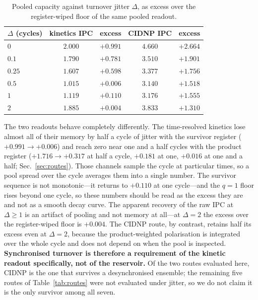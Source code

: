 \documentclass[aps,prx,reprint,superscriptaddress,nofootinbib,floatfix]{revtex4-2}
\begin{document}
\begin{table}[H]
\caption{\label{tab:desync}Pooled capacity against turnover jitter $\Delta$,
as excess over the register-wiped floor of the same pooled readout.}
\begin{ruledtabular}
\begin{tabular}{lcccc}
$\Delta$ (cycles) & kinetics IPC & excess & CIDNP IPC & excess \\
\hline
$0$    & $2.000$ & $+0.991$ & $4.660$ & $+2.664$ \\
$0.1$  & $1.790$ & $+0.781$ & $3.510$ & $+1.901$ \\
$0.25$ & $1.607$ & $+0.598$ & $3.377$ & $+1.756$ \\
$0.5$  & $1.015$ & $+0.006$ & $3.140$ & $+1.518$ \\
$1$    & $1.119$ & $+0.110$ & $3.176$ & $+1.555$ \\
$2$    & $1.885$ & $+0.004$ & $3.833$ & $+1.310$ \\
\end{tabular}
\end{ruledtabular}
\end{table}

The two readouts behave completely differently. The time-resolved kinetics lose
almost all of their memory by half a cycle of jitter with the survivor register
($+0.991\to+0.006$) and reach zero near one and a half cycles with the product
register ($+1.716\to+0.317$ at half a cycle, $+0.181$ at one, $+0.016$ at one and
a half; Sec.~\ref{sec:routes}). Those channels sample the cycle at particular
times, so a pool spread over the cycle averages them into a single number. The
survivor sequence is not monotonic---it returns to $+0.110$ at one cycle---and
the $q=1$ floor rises beyond one cycle, so these numbers should be read as the
excess they are and not as a smooth decay curve. The apparent recovery of the raw IPC at
$\Delta\ge1$ is an artifact of pooling and not memory at all---at $\Delta=2$ the
excess over the register-wiped floor is $+0.004$. The CIDNP route, by contrast,
retains half its excess even at $\Delta=2$, because the product-weighted
polarisation is integrated over the whole cycle and does not depend on when the
pool is inspected. \textbf{Synchronised turnover is therefore a requirement of the
kinetic readout specifically, not of the reservoir.} Of the two routes evaluated
here, CIDNP is the one that survives a desynchronised ensemble; the remaining five
routes of Table~\ref{tab:routes} were not evaluated under jitter, so we do not
claim it is the only survivor among all seven.
\end{document}
